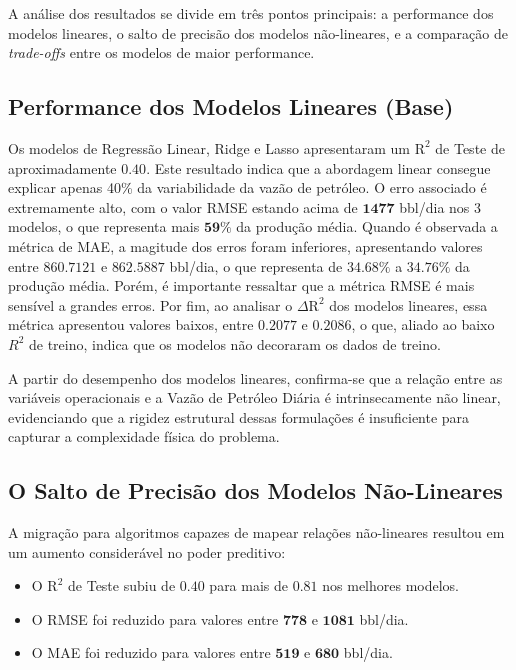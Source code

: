 A análise dos resultados se divide em três pontos principais: a performance dos modelos lineares, o salto de precisão dos modelos não-lineares, e a comparação de \textit{trade-offs} entre os modelos de maior performance.

\subsection{Performance dos Modelos Lineares (Base)}
Os modelos de Regressão Linear, Ridge e Lasso apresentaram um $\text{R}^2$ de Teste de aproximadamente $\mathbf{0.40}$. Este resultado indica que a abordagem linear consegue explicar apenas 40\% da variabilidade da vazão de petróleo. O erro associado é extremamente alto, com o valor \gls{RMSE} estando acima de $\mathbf{1477}$ bbl/dia nos 3 modelos, o que representa mais $\mathbf{59\%}$ da produção média. Quando é observada a métrica de \gls{MAE}, a magitude dos erros foram inferiores, apresentando valores entre $860.7121$ e $862.5887$ bbl/dia, o que representa de $34.68\%$ a $34.76\%$ da produção média. Porém, é importante ressaltar que a métrica \gls{RMSE} é mais sensível a grandes erros. Por fim, ao analisar o $\Delta \text{R}^2$ dos modelos lineares, essa métrica apresentou valores baixos, entre $0.2077$ e $0.2086$, o que, aliado ao baixo $R^2$ de treino, indica que os modelos não decoraram os dados de treino.

A partir do desempenho dos modelos lineares, confirma-se que a relação entre as variáveis operacionais e a Vazão de Petróleo Diária é intrinsecamente não linear, evidenciando que a rigidez estrutural dessas formulações é insuficiente para capturar a complexidade física do problema.

\subsection{O Salto de Precisão dos Modelos Não-Lineares}
A migração para algoritmos capazes de mapear relações não-lineares resultou em um aumento considerável no poder preditivo:

\begin{itemize}
    \item O $\text{R}^2$ de Teste subiu de $0.40$ para mais de $\mathbf{0.81}$ nos melhores modelos.
    \item O \gls{RMSE} foi reduzido para valores entre $\mathbf{778}$ e $\mathbf{1081}$ bbl/dia.
    \item O \gls{MAE} foi reduzido para valores entre $\mathbf{519}$ e $\mathbf{680}$ bbl/dia.
\end{itemize}

